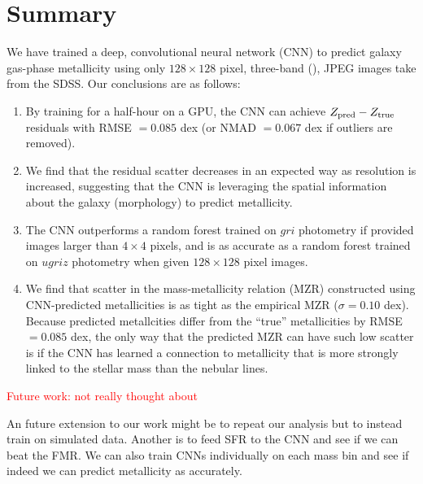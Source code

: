 \documentclass[fleqn,usenatbib]{mnras}
\newcommand{\editorial}[1]{\textcolor{red}{#1}}
\begin{document}
\section{Summary}\label{sec:summary}
We have trained a deep, convolutional neural network (CNN) to predict galaxy gas-phase metallicity using only $128 \times 128$ pixel, three-band (\sdssi\sdssr\sdssg), JPEG images take from the SDSS.
Our conclusions are as follows:
\begin{enumerate}
	\item By training for a half-hour on a GPU, the CNN can achieve $Z_{\rm pred} - Z_{\rm true}$ residuals with RMSE $= 0.085$ dex (or NMAD $= 0.067$ dex if outliers are removed).

	\item We find that the residual scatter decreases in an expected way as resolution is increased, suggesting that the CNN is leveraging the spatial information about the galaxy (morphology) to predict metallicity.

	\item The CNN outperforms a random forest trained on $gri$ photometry if provided images larger than $4\times 4$ pixels, and is as accurate as a random forest trained on $ugriz$ photometry when given $128 \times 128$ pixel \sdssi\sdssr\sdssg{} images.

	\item We find that scatter in the mass-metallicity relation (MZR) constructed using CNN-predicted metallicities is as tight as the empirical MZR ($\sigma = 0.10$ dex).	Because predicted metallcities differ from the ``true'' metallicities by RMSE $= 0.085$ dex, the only way that the predicted MZR can have such low scatter is if the CNN has learned a connection to metallicity that is more strongly linked to the stellar mass than the nebular lines.
\end{enumerate}

\editorial{Future work:}
\editorial{not really thought about}

An future extension to our work might be to repeat our analysis but to instead train on simulated data.
Another is to feed SFR to the CNN and see if we can beat the FMR.
We can also train CNNs individually on each mass bin and see if indeed we can predict metallicity as accurately.
\end{document}
